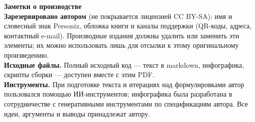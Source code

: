 \clearpage
\thispagestyle{empty}
\begin{flushleft}\small\sffamily
\textbf{Заметки о производстве}\\[1.2em]

\textbf{Зарезервировано автором} (не покрывается лицензией CC BY-SA): имя и
словесный знак Personix, обложка книги и каналы поддержки (QR-коды, адреса,
контактный e-mail). Производные издания должны удалить или заменить эти
элементы; их можно использовать лишь для отсылки к этому оригинальному
произведению.\\[1.2em]

\textbf{Исходные файлы.} Полный исходный код --- текст в markdown, инфографика,
скрипты сборки --- доступен вместе с этим PDF.\\[1.2em]

\textbf{Инструменты.} При подготовке текста и итерациях над формулировками
автор пользовался помощью ИИ-инструментов; инфографика была разработана
в сотрудничестве с генеративными инструментами по спецификациям автора.
Все идеи, аргументы и выводы принадлежат автору.
\end{flushleft}
\clearpage
